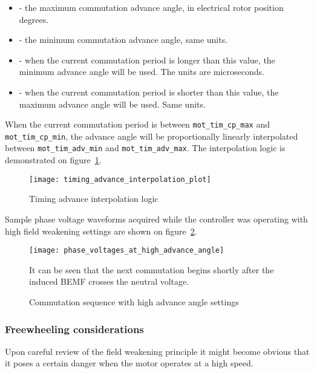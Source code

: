 \documentclass{zubaxdoc}
\begin{document}
	\begin{itemize}
		\item {} - the maximum commutation advance angle, in electrical rotor position degrees.
		\item {} - the minimum commutation advance angle, same units.
		\item {} - when the current commutation period is longer than this value,
		the minimum advance angle will be used. The units are microseconds.
		\item {} - when the current commutation period is shorter than this value,
		the maximum advance angle will be used. Same units.
	\end{itemize}
	
	When the current commutation period is between \verb|mot_tim_cp_max| and \verb|mot_tim_cp_min|,
	the advance angle will be proportionally linearly interpolated between
	\verb|mot_tim_adv_min| and \verb|mot_tim_adv_max|.
	The interpolation logic is demonstrated on figure~\ref{timing_advance_interpolation_plot}.
	
	\begin{figure}[hbt]
		\centering
		\texttt{[image: timing\_advance\_interpolation\_plot]}
		\caption{Timing advance interpolation logic
			\label{timing_advance_interpolation_plot}}
	\end{figure}
	
	Sample phase voltage waveforms acquired while the controller was operating with high field
	weakening settings are shown on figure~\ref{phase_voltages_at_high_advance_angle}.
	
	\begin{figure}[hbtp]
		\centering
		\texttt{[image: phase\_voltages\_at\_high\_advance\_angle]}
		\caption{Commutation sequence with high advance angle settings
			\label{phase_voltages_at_high_advance_angle}}
		It can be seen that the next commutation begins shortly after the induced BEMF
		crosses the neutral voltage.
	\end{figure}
	
	\subsubsection{Freewheeling considerations}
	
	Upon careful review of the field weakening principle it might become obvious that it poses a certain danger
	when the motor operates at a high speed.
	
\end{document}
